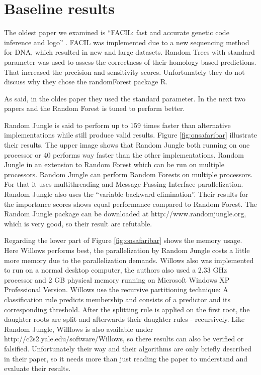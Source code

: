 \documentclass{sig-alternate-05-2015}
\begin{document}
\section{Baseline results}
The oldest paper we examined is ``FACIL: fast and accurate genetic code inference and logo'' \cite{dutilh2011facil}. FACIL was implemented due to a new sequencing method for DNA, which resulted in new and large datasets. Random Trees with standard parameter was used to assess the correctness of their homology-based predictions. That increased the precision and sensitivity scores. Unfortunately they do not discuss why they chose the randomForest package R. 

As said, in the oldes paper they used the standard parameter. In the next two papers \cite{schwarz2010safari} and \cite{zhang2009willows} the Random Forest is tuned to perform better.

Random Jungle is said to perform up to 159 times faster than alternative implementations while still produce valid results. Figure \ref{fig:onsafaribar} illustrate their results. The upper image shows that Random Jungle both running on one processor or 40 performs way faster than the other implementations. Random Jungle in an extension to Random Forest which can be run on multiple processors. Random Jungle can perform Random Forests on multiple processors. For that it uses multithreading and Message Passing Interface parallelization. Random Jungle also uses the ``variable backward elimination''. Their results for the importance scores shows equal performance compared to Random Forest.
The Random Jungle package can be downloaded at http://www.randomjungle.org, which is very good, so their result are refutable.

Regarding the lower part of Figure \ref{fig:onsafaribar} shows the memory usage.
Here Willows performs best, the parallelization by Random Jungle costs a little more memory due to the parallelization demands. Willows also was implemented to run on a normal desktop computer, the authors also used a 2.33 GHz processor and 2 GB physical memory running on Microsoft Windows XP Professional Version. Willows use the recursive partitioning technique: A classification rule predicts membership and consists of a predictor and its corresponding threshold. After the splitting rule is applied on the first root, the daughter roots are split and afterwards their daughter rules - recursively.
Like Random Jungle, Willlows is also available under http://c2s2.yale.edu/software/Willows, so there results can also be verified or falsified. Unfortunately their way and their algorithms are only briefly described in their paper, so it needs more than just reading the paper to understand and evaluate their results.
\end{document}
